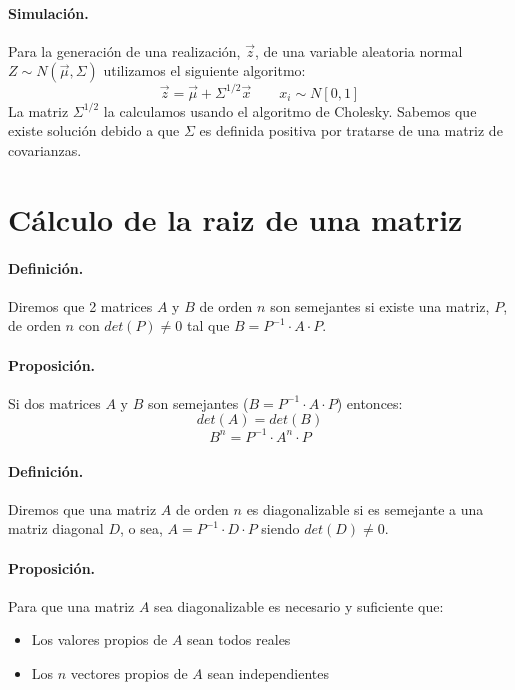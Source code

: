 \paragraph{Simulaci\'on.} Para la generaci\'on de una realizaci\'on, $\vec{z}$, 
de una variable aleatoria normal $Z \sim N(\vec{\mu}, \Sigma)$ utilizamos el 
siguiente algoritmo:
\begin{displaymath}
\vec{z} = \vec{\mu} + \Sigma^{1/2} \vec{x}
\qquad x_i \sim N[0,1]
\end{displaymath}
La matriz $\Sigma^{1/2}$ la calculamos usando el algoritmo de Cholesky. Sabemos 
que existe soluci\'on debido a que $\Sigma$ es definida positiva por tratarse
de una matriz de covarianzas.


\section{C\'alculo de la raiz de una matriz}

\paragraph{Definici\'on.}
Diremos que 2 matrices $A$ y $B$ de orden $n$ son semejantes si existe una 
matriz, $P$, de orden $n$ con $det(P) \neq 0$ tal que 
$B = P^{-1} \cdot A \cdot P$.


\paragraph{Proposici\'on.} Si dos matrices $A$ y $B$ son semejantes 
($B = P^{-1} \cdot A \cdot P$) entonces:
\begin{displaymath}
det(A) = det(B)
\end{displaymath}
\begin{displaymath}
B^n = P^{-1} \cdot A^{n} \cdot P
\end{displaymath}

\paragraph{Definici\'on.} 
Diremos que una matriz $A$ de orden $n$ es diagonalizable si es semejante a una 
matriz diagonal $D$, o sea, $A = P^{-1} \cdot D \cdot P$ siendo $det(D) \neq 0$.

\paragraph{Proposici\'on.} 
Para que una matriz $A$ sea diagonalizable es necesario y suficiente que:
\begin{itemize}
\item Los valores propios de $A$ sean todos reales
\item Los $n$ vectores propios de $A$ sean independientes
\end{itemize}

